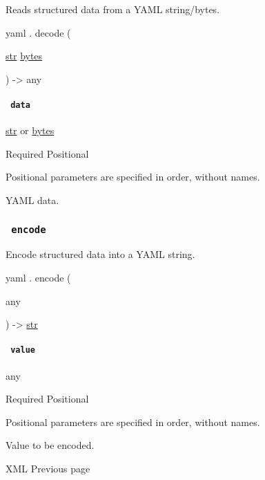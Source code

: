 Reads structured data from a YAML string/bytes.

yaml { . } { decode } (

{ \href{/docs/reference/foundations/str/}{str}
\href{/docs/reference/foundations/bytes/}{bytes} }

) -\textgreater{} { any }

\paragraph{\texorpdfstring{\texttt{\ data\ }}{ data }}\label{definitions-decode-data}

\href{/docs/reference/foundations/str/}{str} {or}
\href{/docs/reference/foundations/bytes/}{bytes}

{Required} {{ Positional }}

\label{definitions-decode-data-positional-tooltip}
Positional parameters are specified in order, without names.

YAML data.

\subsubsection{\texorpdfstring{\texttt{\ encode\ }}{ encode }}\label{definitions-encode}

Encode structured data into a YAML string.

yaml { . } { encode } (

{ { any } }

) -\textgreater{} \href{/docs/reference/foundations/str/}{str}

\paragraph{\texorpdfstring{\texttt{\ value\ }}{ value }}\label{definitions-encode-value}

{ any }

{Required} {{ Positional }}

\label{definitions-encode-value-positional-tooltip}
Positional parameters are specified in order, without names.

Value to be encoded.

\href{/docs/reference/data-loading/xml/}{\pandocbounded{}}

{ XML } { Previous page }

\href{/docs/guides/}{\pandocbounded{}}

